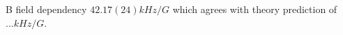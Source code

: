 \documentclass[aps,prl,twocolumn,superscriptaddress]{revtex4-1}
\newcommand{\todo}[1]{}
\begin{document}
B field dependency $42.17(24) kHz/G$ which agrees with theory prediction of $... kHz/G$.

\todo{sm: STIRAP vs Raman}



\end{document}
